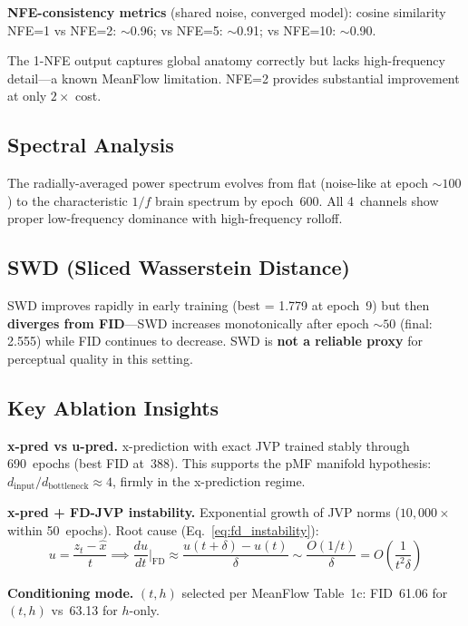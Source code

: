 \documentclass[11pt,a4paper]{article}
\begin{document}
\textbf{NFE-consistency metrics} (shared noise, converged model):
cosine similarity NFE=1 vs NFE=2: ${\sim}$0.96; vs NFE=5: ${\sim}$0.91;
vs NFE=10: ${\sim}$0.90.

The 1-NFE output captures global anatomy correctly but lacks high-frequency
detail---a known MeanFlow limitation.  NFE=2 provides substantial improvement
at only $2\times$ cost.

\subsection{Spectral Analysis}

The radially-averaged power spectrum evolves from flat (noise-like at epoch
${\sim}100$) to the characteristic $1/f$ brain spectrum by epoch~600.  All
4~channels show proper low-frequency dominance with high-frequency rolloff.

\subsection{SWD (Sliced Wasserstein Distance)}

SWD improves rapidly in early training (best = 1.779 at epoch~9) but then
\textbf{diverges from FID}---SWD increases monotonically after epoch ${\sim}50$
(final: 2.555) while FID continues to decrease.  SWD is \textbf{not a reliable
proxy} for perceptual quality in this setting.

\subsection{Key Ablation Insights}

\textbf{x-pred vs u-pred.}  x-prediction with exact JVP trained stably through
690~epochs (best FID at~388).  This supports the pMF manifold hypothesis:
$d_{\mathrm{input}}/d_{\mathrm{bottleneck}} \approx 4$, firmly in the
x-prediction regime.

\textbf{x-pred + FD-JVP instability.}  Exponential growth of JVP norms
($10{,}000\times$ within 50~epochs).  Root cause (Eq.~\ref{eq:fd_instability}):
\begin{equation}
  u = \frac{z_t - \hat{x}}{t} \implies
  \frac{du}{dt}\bigg|_{\mathrm{FD}}
    \approx \frac{u(t{+}\delta)-u(t)}{\delta}
    \sim \frac{O(1/t)}{\delta}
    = O\!\left(\frac{1}{t^2 \delta}\right)
\end{equation}

\textbf{Conditioning mode.}  $(t,h)$ selected per MeanFlow Table~1c: FID~61.06
for $(t,h)$ vs~63.13 for $h$-only.
\end{document}
